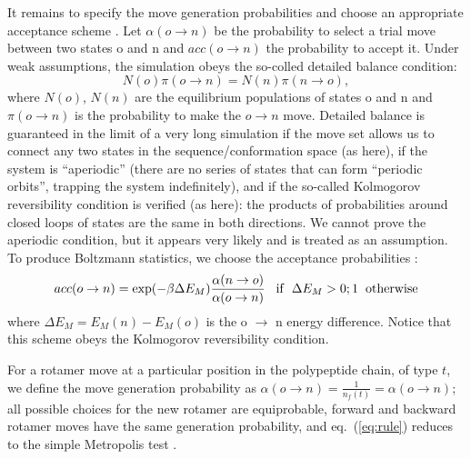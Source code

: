 It remains to specify the move generation probabilities and choose an appropriate acceptance scheme \cite{Metropolis53,
FrenkelBK,GrimmetBK}.
Let $\alpha(o \rightarrow n)$ be the probability to select a trial move between two states
o and n and $acc(o \rightarrow n)$ the probability to accept it. Under weak assumptions, the simulation obeys the so-colled detailed balance condition:
\begin{equation}
N(o) \pi(o \rightarrow n) = N(n) \pi(n \rightarrow o), \label{eq:balance}
\end{equation}
where $N(o)$, $N(n)$ are the equilibrium populations of states o and n and $\pi(o \rightarrow n)$ is the probability to make the $o \rightarrow n$ move. Detailed balance is guaranteed in the limit of a very long simulation if the move set allows us to connect any two states in the sequence/conformation space (as here), if the system is ``aperiodic'' (there are no series of states that can form “periodic orbits”, trapping the system indefinitely), and if the so-called Kolmogorov reversibility condition is verified (as here): the products of probabilities around closed loops of states are the same in both directions. We cannot prove the aperiodic condition, but it appears very likely and is treated as an assumption.  
To produce Boltzmann statistics, we choose the acceptance probabilities \cite{Metropolis53,FrenkelBK,GrimmetBK}:
\begin{equation} \label{eq:rule}
acc(o \rightarrow n) = \exp(-\beta \Delta E_M) \frac{ \alpha(n \rightarrow o) }{ \alpha(o \rightarrow n) }
{\rm \hspace*{3mm} if \hspace*{2mm} } \Delta E_M > 0; 1 {\rm \hspace*{2mm} otherwise}
\end{equation}
where $\Delta E_M = E_M(n) - E_M(o)$ is the o $\rightarrow$ n energy difference. 
Notice that this scheme obeys the Kolmogorov reversibility condition.

For a rotamer move at a particular position in the polypeptide chain, of type $t$, we define the move generation
probability as $\alpha(o \rightarrow n) = \frac{1}{n_f(t)} = \alpha(o \rightarrow n)$; all possible choices for
the new rotamer are equiprobable, forward and backward rotamer moves have the same generation probability, and
eq.\ (\ref{eq:rule}) reduces to the simple Metropolis test \cite{Metropolis53}.


